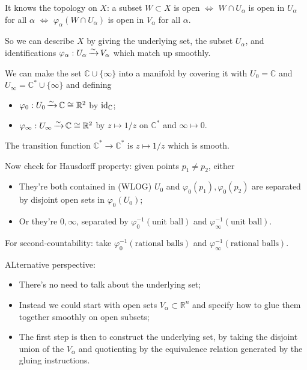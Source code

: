 \documentclass[a4paper,11pt]{article}
\begin{document}
	It knows the topology on $X$: a subset $W \subset X$ is open $\Leftrightarrow$ $W \cap U_\alpha$ is open in $U_\alpha$ for all $\alpha$ $\Leftrightarrow$ $\varphi_\alpha(W\cap U_\alpha)$ is open in $V_\alpha$ for all $\alpha$.

	So we can describe $X$ by giving the underlying set, the subset $U_\alpha$, and identifications $\varphi_\alpha: U_\alpha \operatorname{\xrightarrow{\sim}} V_\alpha$ which match up smoothly.

	\begin{ex}
		We can make the set $\mathbb{C}\cup \{\infty\}$ into a manifold by covering it with $U_0 = \mathbb{C}$ and $U_\infty = \mathbb{C}^* \cup \{\infty\}$ and defining
		\begin{itemize}
			\item $\varphi_0 : U_0 \operatorname{\xrightarrow{\sim}} \mathbb{C} \cong \mathbb{R}^2$ by $\operatorname{id}_{\mathbb{C}}$;
			\item $\varphi_{\infty}: U_\infty \operatorname{\xrightarrow{\sim}} \mathbb{C} \cong \mathbb{R}^2$ by $z \mapsto 1/z$ on $\mathbb{C}^*$ and $\infty \mapsto 0$. 
		\end{itemize}
		The transition function $\mathbb{C}^* \to \mathbb{C}^*$ is $z \mapsto 1/z$ which is smooth.

		Now check for Hausdorff property: given points $p_1 \neq p_2$, either
		\begin{itemize}
			\item They're both contained in (WLOG) $U_0$ and $\varphi_0 (p_1), \varphi_0(p_2)$ are separated by disjoint open sets in $\varphi_0 (U_0)$;
			\item Or they're $0, \infty$, separated by $\varphi_0^{-1}(\text{unit ball})$ and $\varphi_\infty^{-1}(\text{unit ball})$.
		\end{itemize}

		For second-countability: take $\varphi_0^{-1}(\text{rational balls})$ and $\varphi_\infty^{-1}(\text{rational balls})$.
	\end{ex}

	ALternative perspective:
	\begin{itemize}
		\item There's no need to talk about the underlying set;
		\item Instead we could start with open sets $V_\alpha \subset \mathbb{R}^n$ and specify how to glue them together smoothly on open subsets;
		\item The first step is then to construct the underlying set, by taking the disjoint union of the $V_\alpha$ and quotienting by the equivalence relation generated by the gluing instructions.
	\end{itemize}
\end{document}

